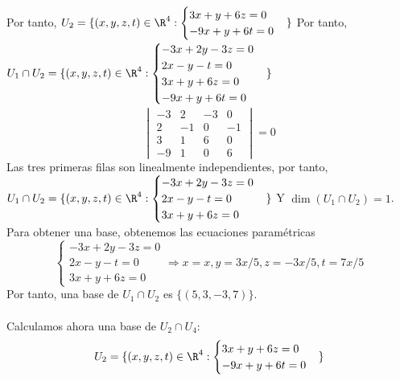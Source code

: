 \begin{ejercicio}
\begin{enumerate}
\begin{equation*}
    \end{equation*}
    Por tanto, $U_2 = \{(x,y,z,t) \in \R^4 : \begin{cases}
        3x + y + 6z = 0 \\
        -9x + y + 6t = 0
    \end{cases}\}$
    Por tanto, $U_1 \cap U_2 = \{(x,y,z,t) \in \R^4 : \begin{cases}
        -3x + 2y - 3z = 0 \\
        2x - y - t = 0 \\
        3x + y + 6z = 0 \\
        -9x + y + 6t = 0
    \end{cases}\}$
    \begin{equation*}
        \begin{vmatrix}
            -3 & 2 & -3 & 0 \\
            2 & -1 & 0 & -1 \\
            3 & 1 & 6 & 0 \\
            -9 & 1 & 0 & 6
        \end{vmatrix} = 0 
    \end{equation*}
    Las tres primeras filas son linealmente independientes, por tanto, 
    $U_1 \cap U_2 = \{(x,y,z,t) \in \R^4 : \begin{cases}
        -3x + 2y - 3z = 0 \\
        2x - y - t = 0 \\
        3x + y + 6z = 0 
    \end{cases}\}$
    Y $\dim(U_1 \cap U_2) = 1$. Para obtener una base, obtenemos las ecuaciones paramétricas 
    \begin{equation*}
        \begin{cases}
            -3x + 2y - 3z = 0 \\
        2x - y - t = 0 \\
        3x + y + 6z = 0 
        \end{cases} \Rightarrow x = x, y = 3x/5, z = -3x/5, t = 7x/5
    \end{equation*} Por tanto, una base de $U_1 \cap U_2$ es $\{(5, 3, -3, 7)\}$.
    \\ \\
    Calculamos ahora una base de $U_2 \cap U_4$:
    \begin{align*}
        U_2 &= \{(x,y,z,t) \in \R^4 : \begin{cases}
            3x + y + 6z = 0 \\
            -9x + y + 6t = 0
        \end{cases}\} \\

\end{align*}
\end{enumerate}
\end{ejercicio}
